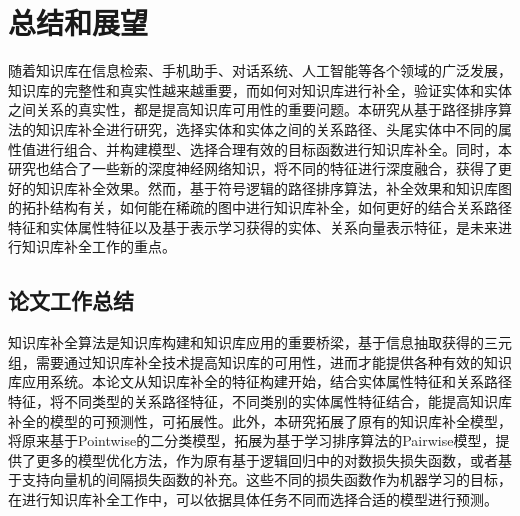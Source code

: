 
\chapter{总结和展望}
\label{cha:kbc-summary}
随着知识库在信息检索、手机助手、对话系统、人工智能等各个领域的广泛发展，知识库的完整性和真实性越来越重要，而如何对知识库进行补全，验证实体和实体之间关系的真实性，都是提高知识库可用性的重要问题。本研究从基于路径排序算法的知识库补全进行研究，选择实体和实体之间的关系路径、头尾实体中不同的属性值进行组合、并构建模型、选择合理有效的目标函数进行知识库补全。同时，本研究也结合了一些新的深度神经网络知识，将不同的特征进行深度融合，获得了更好的知识库补全效果。然而，基于符号逻辑的路径排序算法，补全效果和知识库图的拓扑结构有关，如何能在稀疏的图中进行知识库补全，如何更好的结合关系路径特征和实体属性特征以及基于表示学习获得的实体、关系向量表示特征，是未来进行知识库补全工作的重点。

\section{论文工作总结}
知识库补全算法是知识库构建和知识库应用的重要桥梁，基于信息抽取获得的三元组，需要通过知识库补全技术提高知识库的可用性，进而才能提供各种有效的知识库应用系统。本论文从知识库补全的特征构建开始，结合实体属性特征和关系路径特征，将不同类型的关系路径特征，不同类别的实体属性特征结合，能提高知识库补全的模型的可预测性，可拓展性。此外，本研究拓展了原有的知识库补全模型，将原来基于Pointwise的二分类模型，拓展为基于学习排序算法的Pairwise模型，提供了更多的模型优化方法，作为原有基于逻辑回归中的对数损失损失函数，或者基于支持向量机的间隔损失函数的补充。这些不同的损失函数作为机器学习的目标，在进行知识库补全工作中，可以依据具体任务不同而选择合适的模型进行预测。

